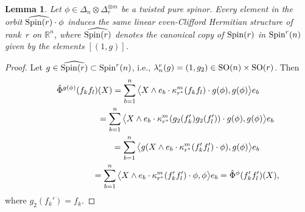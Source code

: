 \documentclass[10pt,a4paper]{amsart}
\numberwithin{equation}{section}
\newtheorem{Lemma}[Theorem]{Lemma}
\begin{document}
\begin{Lemma}\label{lemma: Spin(r) orbit pure spinor}Let $\phi\in\Delta_n\otimes\Delta_r^{\otimes m}$ be a twisted pure spinor. Every element in the orbit $\widehat{{\rm Spin}(r)}\cdot \phi$ induces the same linear even-Clifford Hermitian structure of rank~$r$ on $\mathbb{R}^n$, where $\widehat{{\rm Spin}(r)}$ denotes the canonical copy of ${\rm Spin}(r)$ in ${\rm Spin}^r(n)$ given by the elements $[(1,g)]$.
\end{Lemma}
\begin{proof} Let $g\in \widehat{{\rm Spin}(r)}\subset {\rm Spin}^r(n)$, i.e., $\lambda_n^r(g) = (1,g_2)\in {\rm SO}(n)\times {\rm SO}(r)$. Then
\begin{gather*}
\hat\Phi^{g(\phi)}(f_kf_l)(X) = \sum_{b=1}^n \big\langle X\wedge e_b\cdot \kappa_{r^*}^m(f_kf_l)\cdot g(\phi),g(\phi)\big\rangle e_b \\
\hphantom{\hat\Phi^{g(\phi)}(f_kf_l)(X)}{} =
 \sum_{b=1}^n\big\langle X\wedge e_b\cdot \kappa_{r^*}^m(g_2(f_k')g_2(f_l'))\cdot g(\phi),g(\phi)\big\rangle e_b\\
\hphantom{\hat\Phi^{g(\phi)}(f_kf_l)(X)}{} =
 \sum_{b=1}^n\big\langle g(X\wedge e_b\cdot \kappa_{r^*}^m(f_k'f_l')\cdot \phi),g(\phi)\big\rangle e_b\\
\hphantom{\hat\Phi^{g(\phi)}(f_kf_l)(X)}{} =
 \sum_{b=1}^n\big\langle X\wedge e_b\cdot \kappa_{r^*}^m(f_k'f_l')\cdot \phi,\phi\big\rangle e_b =
\hat\Phi^\phi(f_k'f_l')(X),
\end{gather*}
where $g_2(f_k')=f_k$.
\end{proof}
\end{document}
